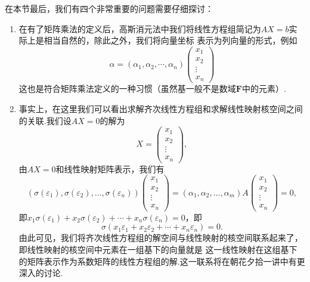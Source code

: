 在本节最后，我们有四个非常重要的问题需要仔细探讨：
\begin{enumerate}
    \item 在有了矩阵乘法的定义后，高斯消元法中我们将线性方程组简记为$AX=b$实际上是相当自然的，除此之外，我们将向量坐标
    表示为列向量的形式，例如
    \[\alpha=(\alpha_1,\alpha_2,\cdots,\alpha_n)\begin{pmatrix}
        x_1 \\ x_2 \\ \vdots \\ x_n
    \end{pmatrix}\]
    这也是符合矩阵乘法定义的一种习惯（虽然基一般不是数域$\mathbf{F}$中的元素）.

    \item 事实上，在这里我们可以看出求解齐次线性方程组和求解线性映射核空间之间的关联.我们设$AX=0$的解为
    \[X=\begin{pmatrix}
        x_1 \\ x_2 \\ \vdots \\ x_n
    \end{pmatrix},\]
    由$AX=0$和线性映射矩阵表示，我们有
    \begin{equation}\label{eq:7:方程组与核空间1}
        (\sigma(\varepsilon_1),\sigma(\varepsilon_2),\ldots,\sigma(\varepsilon_n))\begin{pmatrix}
            x_1 \\ x_2 \\ \vdots \\ x_n
        \end{pmatrix}=(\alpha_1,\alpha_2,\ldots,\alpha_m)A\begin{pmatrix}
            x_1 \\ x_2 \\ \vdots \\ x_n
        \end{pmatrix}=0,
    \end{equation}
    即$x_1\sigma(\varepsilon_1)+x_2\sigma(\varepsilon_2)+\cdots+x_n\sigma(\varepsilon_n)=0$，即
    \begin{equation}\label{eq:7:方程组与核空间2}
        \sigma(x_1\varepsilon_1+x_2\varepsilon_2+\cdots+x_n\varepsilon_n)=0.
    \end{equation}
    由此可见，我们将齐次线性方程组的解空间与线性映射的核空间联系起来了，即线性映射的核空间中元素在一组基下的向量就是
    这一线性映射在这组基下的矩阵表示作为系数矩阵的线性方程组的解.这一联系将在朝花夕拾一讲中有更深入的讨论.


\end{enumerate}

